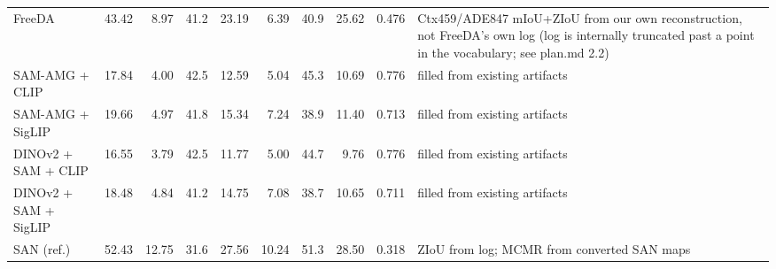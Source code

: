 \begin{table}[t]
\begin{adjustbox}{max width=\textwidth}
\begin{tabular}{lrrrrrrrrp{}}
FreeDA & 43.42 & 8.97 & 41.2 & 23.19 & 6.39 & 40.9 & 25.62 & 0.476 & Ctx459/ADE847 mIoU+ZIoU from our own reconstruction, not FreeDA's own log (log is internally truncated past a point in the vocabulary; see plan.md 2.2) \\
SAM-AMG + CLIP & 17.84 & 4.00 & 42.5 & 12.59 & 5.04 & 45.3 & 10.69 & 0.776 & filled from existing artifacts \\
SAM-AMG + SigLIP & 19.66 & 4.97 & 41.8 & 15.34 & 7.24 & 38.9 & 11.40 & 0.713 & filled from existing artifacts \\
DINOv2 + SAM + CLIP & 16.55 & 3.79 & 42.5 & 11.77 & 5.00 & 44.7 & 9.76 & 0.776 & filled from existing artifacts \\
DINOv2 + SAM + SigLIP & 18.48 & 4.84 & 41.2 & 14.75 & 7.08 & 38.7 & 10.65 & 0.711 & filled from existing artifacts \\
SAN (ref.) & 52.43 & 12.75 & 31.6 & 27.56 & 10.24 & 51.3 & 28.50 & 0.318 & ZIoU from log; MCMR from converted SAN maps \\
\bottomrule
\end{tabular}
\end{adjustbox}
\end{table}
